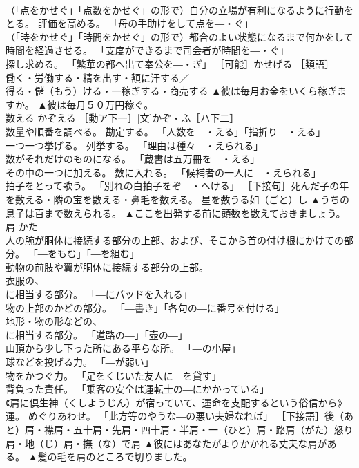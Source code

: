 \documentclass[8pt]{extreport}
\begin{document}
\begin{CJK}{UTF8}{min}
\\	（「点をかせぐ」「点数をかせぐ」の形で）自分の立場が有利になるように行動をとる。 評価を高める。 「母の手助けをして点を―・ぐ」 
\\	（「時をかせぐ」「時間をかせぐ」の形で）都合のよい状態になるまで何かをして時間を経過させる。 「支度ができるまで司会者が時間を―・ぐ」 
\\	探し求める。 「繁華の都へ出て奉公を―・ぎ」 ［可能］かせげる ［類語］
\\	働く・労働する・精を出す・額に汗する／
\\	得る・儲（もう）ける・一稼ぎする・商売する	▲彼は毎月お金をいくら稼ぎますか。 ▲彼は毎月５０万円稼ぐ。
\\	数える	かぞえる	［動ア下一］[文]かぞ・ふ［ハ下二］ 
\\	数量や順番を調べる。 勘定する。 「人数を―・える」「指折り―・える」 
\\	一つ一つ挙げる。 列挙する。 「理由は種々―・えられる」 
\\	数がそれだけのものになる。 「蔵書は五万冊を―・える」 
\\	その中の一つに加える。 数に入れる。 「候補者の一人に―・えられる」 
\\	拍子をとって歌う。 「別れの白拍子をぞ―・へける」 ［下接句］死んだ子の年を数える・隣の宝を数える・鼻毛を数える。 星を数うる如（ごと）し	▲うちの息子は百まで数えられる。 ▲ここを出発する前に頭数を数えておきましょう。
\\	肩	かた	
\\	人の腕が胴体に接続する部分の上部、および、そこから首の付け根にかけての部分。 「―をもむ」「―を組む」 
\\	動物の前肢や翼が胴体に接続する部分の上部。 
\\	衣服の、 
\\	に相当する部分。 「―にパッドを入れる」 
\\	物の上部のかどの部分。 「―書き」「各句の―に番号を付ける」 
\\	地形・物の形などの、 
\\	に相当する部分。 「道路の―」「壺の―」 
\\	山頂から少し下った所にある平らな所。 「―の小屋」 
\\	球などを投げる力。 「―が弱い」 
\\	物をかつぐ力。 「足をくじいた友人に―を貸す」 
\\	背負った責任。 「乗客の安全は運転士の―にかかっている」 
\\	《肩に倶生神（くしようじん）が宿っていて、運命を支配するという俗信から》運。 めぐりあわせ。 「此方等のやうな―の悪い夫婦なれば」 ［下接語］後（あと）肩・襟肩・五十肩・先肩・四十肩・半肩・一（ひと）肩・路肩（がた）怒り肩・地（じ）肩・撫（な）で肩	▲彼にはあなたがよりかかれる丈夫な肩がある。 ▲髪の毛を肩のところで切りました。

\end{CJK}
\end{document}

